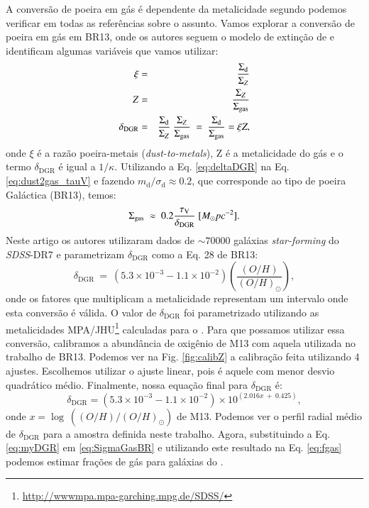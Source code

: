 A conversão de poeira em gás é dependente da metalicidade segundo podemos verificar em todas as
referências sobre o assunto. Vamos explorar a conversão de poeira em gás em BR13, onde os autores
seguem o modelo de extinção de \citet{Charlot.Fall.2000a} e identificam algumas variáveis que vamos
utilizar:
\begin{eqnarray}
	\xi &=& \frac{\Sigma_{\mathrm{d}}}{\Sigma_Z} \\
	Z &=& \frac{\Sigma_Z}{\Sigma_{\mathrm{gas}}}  \\
	\delta_{\mathrm{DGR}} &=& \frac{\Sigma_{\mathrm{d}}}{\Sigma_Z}\ \frac{\Sigma_Z}{\Sigma_{\mathrm{gas}}}\ =\
\frac{\Sigma_{\mathrm{d}}}{\Sigma_{\mathrm{gas}}} = \xi Z,
	\label{eq:deltaDGR}
\end{eqnarray}
\noindent onde $\xi$ é a razão poeira-metais ({\em dust-to-metals}), Z é a metalicidade do gás e o
termo $\delta_{\mathrm{DGR}}$ é igual a $1/\kappa$. Utilizando a Eq. \ref{eq:deltaDGR} na Eq.
\ref{eq:dust2gas_tauV} e fazendo $m_{\mathrm{d}}/\sigma_{\mathrm{d}} \approx 0.2$, que corresponde
ao tipo de poeira Galáctica (BR13), temos:
\begin{equation}
	\Sigma_{\mathrm{gas}}\ \approx\ 0.2 \frac{\tau_{\mathrm{V}}}{\delta_{\mathrm{DGR}}}\ [M_\odot pc^{-2}].
	\label{eq:SigmaGasBR}
\end{equation}
Neste artigo os autores utilizaram dados de $\sim 70000$ galáxias {\em star-forming} do
\textit{SDSS}-DR7 e parametrizam $\delta_{\mathrm{DGR}}$ como a Eq. 28 de BR13:
\begin{equation}
	\delta_{\mathrm{DGR}}\ =\ (5.3 \times 10^{-3} - 1.1 \times 10^{-2})
\left(\frac{(O/H)}{(O/H)_\odot}\right),
	\label{eq:DGR_brinch_eq28}
\end{equation}
\noindent onde os fatores que multiplicam a metalicidade representam um intervalo onde esta
conversão é válida. O valor de $\delta_{\mathrm{DGR}}$ foi parametrizado utilizando as metalicidades
MPA/JHU\footnote{\href{http://wwwmpa.mpa-garching.mpg.de/SDSS/}{http://wwwmpa.mpa-garching.mpg.de/SDSS/}}
calculadas para o \SDSS. Para que possamos utilizar essa conversão, calibramos a abundância de
oxigênio de M13 com aquela utilizada no trabalho de BR13. Podemos ver na Fig. \ref{fig:calibZ} a
calibração feita utilizando 4 ajustes. Escolhemos utilizar o ajuste linear, pois é aquele com menor
desvio quadrático médio. Finalmente, nossa equação final para $\delta_{\mathrm{DGR}}$ é:
\begin{equation}
	\delta_{\mathrm{DGR}} =  (5.3 \times 10^{-3} - 1.1 \times 10^{-2}) \times 10^{\left(2.016 x\ +\ 0.425\right)},
	\label{eq:myDGR}
\end{equation}
\noindent onde $x = \log\ ((O/H)/(O/H)_\odot)$ de M13. Podemos ver o perfil radial médio de
$\delta_{\mathrm{DGR}}$ para a amostra definida neste trabalho. Agora, substituindo a Eq.
\ref{eq:myDGR} em \ref{eq:SigmaGasBR} e utilizando este resultado na Eq. \ref{eq:fgas} podemos
estimar frações de gás para galáxias do \CAL.

